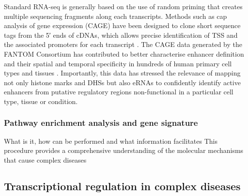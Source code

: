 Standard RNA-seq is generally based on the use of random priming that creates multiple sequencing fragments along each transcripts. Methods such as cap analysis of gene expression (CAGE) have been designed to clone short sequence tags from the 5′ ends of cDNAs, which allows precise identification of TSS and the associated promoters for each transcript \parencite{FANTOM2014}. The CAGE data generated by the FANTOM Consortium has contributed to better characterise enhancer definition and their spatial and temporal specificity in hundreds of human primary cell types and tissues \parencite{Andersson2014}. Importantly, this data has stressed the relevance of mapping not only histone marks and DHSs but also eRNAs to confidently identify active enhancers from putative regulatory regions non-functional in a particular cell type, tissue or condition.


\subsubsection{Pathway enrichment analysis and gene signature}
What is it, how can be performed and what information facilitates
This procedure provides a comprehensive understanding of the molecular mechanisms that cause complex diseases


\subsection{Transcriptional regulation in complex diseases}


